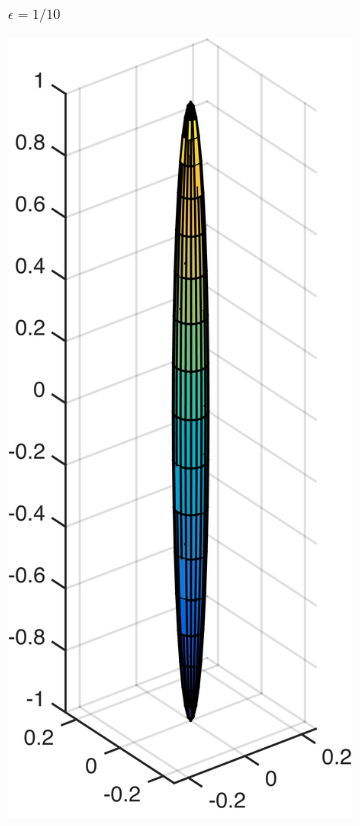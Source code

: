 \documentclass[a4paper,11pt]{kth-mag}
\begin{document}
\begin{figure}[!htbp]
\begin{subfigure}[h]{0.24\textwidth}
    \caption{$\epsilon=1/10$}\label{fig:slenderness_1_10}
  \end{subfigure}
  \begin{subfigure}[h]{0.24\textwidth}
    \centering
    \includegraphics[width=\textwidth]{img/slender/1_20.png}

\end{subfigure}
\end{figure}
\end{document}
